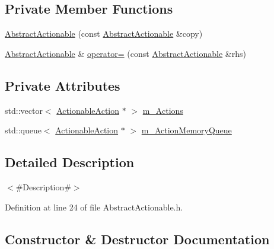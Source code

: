 \subsection*{Private Member Functions}
\begin{DoxyCompactItemize}
\item 
\mbox{\hyperlink{classnjli_1_1_abstract_actionable_a7674886976b87af3bfa33ad030268e3e}{Abstract\+Actionable}} (const \mbox{\hyperlink{classnjli_1_1_abstract_actionable}{Abstract\+Actionable}} \&copy)
\item 
\mbox{\hyperlink{classnjli_1_1_abstract_actionable}{Abstract\+Actionable}} \& \mbox{\hyperlink{classnjli_1_1_abstract_actionable_a0f09166a53c6d1b5652ad268fcdfcb46}{operator=}} (const \mbox{\hyperlink{classnjli_1_1_abstract_actionable}{Abstract\+Actionable}} \&rhs)
\end{DoxyCompactItemize}
\subsection*{Private Attributes}
\begin{DoxyCompactItemize}
\item 
std\+::vector$<$ \mbox{\hyperlink{structnjli_1_1_abstract_actionable_1_1_actionable_action}{Actionable\+Action}} $\ast$ $>$ \mbox{\hyperlink{classnjli_1_1_abstract_actionable_a17bc44206dd13cb179bafdf0cd2bbda9}{m\+\_\+\+Actions}}
\item 
std\+::queue$<$ \mbox{\hyperlink{structnjli_1_1_abstract_actionable_1_1_actionable_action}{Actionable\+Action}} $\ast$ $>$ \mbox{\hyperlink{classnjli_1_1_abstract_actionable_a230d6ee2c4c2cd3f7d4e716ea238dbfc}{m\+\_\+\+Action\+Memory\+Queue}}
\end{DoxyCompactItemize}


\subsection{Detailed Description}
$<$\#\+Description\#$>$ 

Definition at line 24 of file Abstract\+Actionable.\+h.



\subsection{Constructor \& Destructor Documentation}
\mbox{\label{classnjli_1_1_abstract_actionable_a14bdb9bfc024571d6989763629625949}} 
